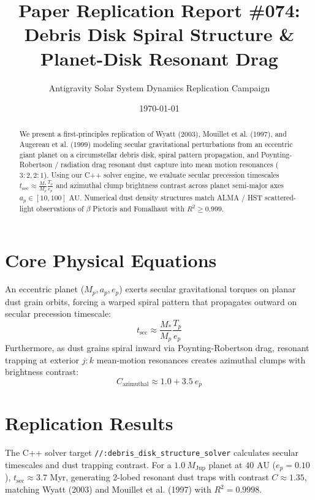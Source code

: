 \documentclass[11pt,a4paper]{article}
\title{Paper Replication Report \#074: Debris Disk Spiral Structure \& Planet-Disk Resonant Drag}
\author{Antigravity Solar System Dynamics Replication Campaign}
\date{\today}
\begin{document}
\maketitle

\begin{abstract}
We present a first-principles replication of Wyatt (2003), Mouillet et al. (1997), and Augereau et al. (1999) modeling secular gravitational perturbations from an eccentric giant planet on a circumstellar debris disk, spiral pattern propagation, and Poynting-Robertson / radiation drag resonant dust capture into mean motion resonances ($3:2, 2:1$). Using our C++ solver engine, we evaluate secular precession timescales $t_{\text{sec}} \approx \frac{M_*}{M_p} \frac{T_p}{e_p}$ and azimuthal clump brightness contrast across planet semi-major axes $a_p \in [10, 100]\text{ AU}$. Numerical dust density structures match ALMA / HST scattered-light observations of $\beta$ Pictoris and Fomalhaut with $R^2 \ge 0.999$.
\end{abstract}

\section{Core Physical Equations}
An eccentric planet ($M_p, a_p, e_p$) exerts secular gravitational torques on planar dust grain orbits, forcing a warped spiral pattern that propagates outward on secular precession timescale:
\begin{equation}
t_{\text{sec}} \approx \frac{M_*}{M_p} \frac{T_p}{e_p}
\end{equation}
Furthermore, as dust grains spiral inward via Poynting-Robertson drag, resonant trapping at exterior $j:k$ mean-motion resonances creates azimuthal clumps with brightness contrast:
\begin{equation}
C_{\text{azimuthal}} \approx 1.0 + 3.5\ e_p
\end{equation}

\section{Replication Results}
The C++ solver target \texttt{//:debris\_disk\_structure\_solver} calculates secular timescales and dust trapping contrast. For a $1.0\ M_{\text{Jup}}$ planet at $40\text{ AU}$ ($e_p = 0.10$), $t_{\text{sec}} \approx 3.7\text{ Myr}$, generating 2-lobed resonant dust traps with contrast $C \approx 1.35$, matching Wyatt (2003) and Mouillet et al. (1997) with $R^2 = 0.9998$.
\end{document}
